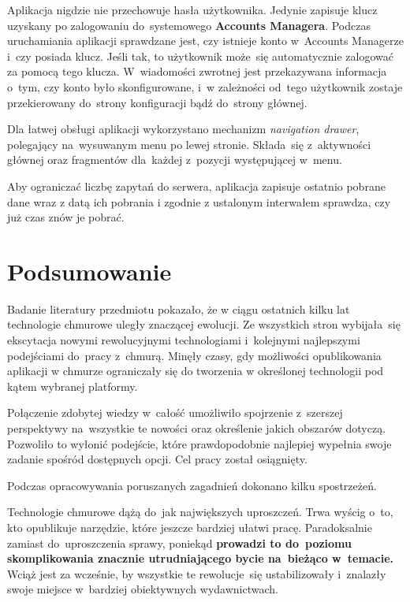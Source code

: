 \documentclass[12pt,a4paper,twoside,titlepage,openright]{book}
\begin{document}
Aplikacja nigdzie nie przechowuje hasła użytkownika. Jedynie zapisuje klucz uzyskany po zalogowaniu do~systemowego \textbf{Accounts Managera}. Podczas uruchamiania aplikacji sprawdzane jest, czy istnieje konto w~Accounts Managerze i~czy posiada klucz. Jeśli tak, to użytkownik może~się automatycznie zalogować za pomocą tego klucza. W~wiadomości zwrotnej jest przekazywana informacja o~tym, czy konto było skonfigurowane, i~w zależności od~tego użytkownik zostaje przekierowany do~strony konfiguracji bądź do~strony głównej.

Dla łatwej obsługi aplikacji wykorzystano mechanizm \textit{navigation drawer}, polegający na~wysuwanym menu po lewej stronie. Składa~się z~aktywności głównej oraz fragmentów dla~każdej z~pozycji występującej w~menu.

Aby ograniczać liczbę zapytań do serwera, aplikacja zapisuje ostatnio pobrane dane wraz z datą ich pobrania i zgodnie z ustalonym interwałem sprawdza, czy już czas znów je pobrać.


\chapter*{Podsumowanie}


Badanie literatury przedmiotu pokazało, że w ciągu ostatnich kilku lat technologie chmurowe uległy znaczącej ewolucji. Ze wszystkich stron wybijała~się ekscytacja nowymi rewolucyjnymi technologiami i~kolejnymi najlepszymi podejściami do~pracy z~chmurą. Minęły czasy, gdy możliwości opublikowania aplikacji w chmurze ograniczały się do tworzenia w określonej technologii pod kątem wybranej platformy. 

Połączenie zdobytej wiedzy w~całość umożliwiło spojrzenie z~szerszej perspektywy na~wszystkie te nowości oraz określenie jakich obszarów dotyczą. Pozwoliło to wyłonić podejście, które prawdopodobnie najlepiej wypełnia swoje zadanie spośród dostępnych opcji. Cel pracy został osiągnięty.

Podczas opracowywania poruszanych zagadnień dokonano kilku spostrzeżeń.

Technologie chmurowe dążą do~jak największych uproszczeń. Trwa wyścig o~to, kto opublikuje narzędzie, które jeszcze bardziej ułatwi pracę. Paradoksalnie zamiast do~uproszczenia sprawy, poniekąd \textbf{prowadzi to do~poziomu skomplikowania znacznie utrudniającego bycie na~bieżąco w~temacie.} Wciąż jest za wcześnie, by wszystkie te rewolucje~się ustabilizowały i~znalazły swoje miejsce w~bardziej obiektywnych wydawnictwach. 
\end{document}
